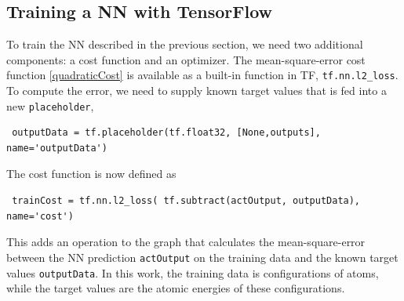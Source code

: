 \documentclass[twoside,english]{uiofysmaster}
\begin{document}
\subsection{Training a NN with TensorFlow}
To train the NN described in the previous section, we need two additional components:
a cost function and an optimizer. The mean-square-error cost function \eqref{quadraticCost} is available as a 
built-in function in TF, \texttt{tf.nn.l2\_loss}. To compute the error, we need to supply known 
target values that is fed into a new \texttt{placeholder},
\begin{verbatim}
 outputData = tf.placeholder(tf.float32, [None,outputs], name='outputData')
\end{verbatim}
The cost function is now defined as
\begin{verbatim}
 trainCost = tf.nn.l2_loss( tf.subtract(actOutput, outputData), name='cost')
\end{verbatim}
This adds an operation to the graph that calculates the mean-square-error between the NN prediction \texttt{actOutput}
on the training data 
and the known target values \texttt{outputData}. In this work, the training data is configurations of atoms, 
while the target values are the atomic energies of these configurations. 
\end{document}
